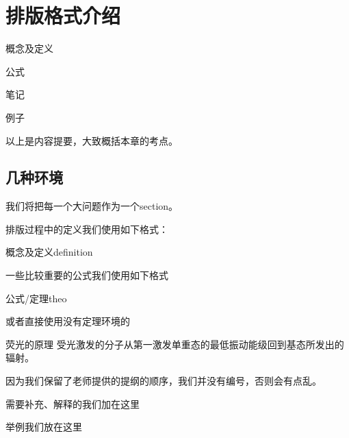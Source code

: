 \chapter*{排版格式介绍}
\begin{introduction}
	\item 概念及定义
	\item 公式
	\item 笔记
	\item 例子
\end{introduction}

以上是内容提要，大致概括本章的考点。

\section*{几种环境}
我们将把每一个大问题作为一个section。

排版过程中的定义我们使用如下格式：

\begin{definition*}{概念及定义}{definition}
	
\end{definition*}

一些比较重要的公式我们使用如下格式
\begin{theorem*}{公式/定理}{theo}
	
\end{theorem*}

或者直接使用没有定理环境的
\begin{emptytcb*}{荧光的原理}{}
	受光激发的分子从第一激发单重态的最低振动能级回到基态所发出的辐射。
\end{emptytcb*}

因为我们保留了老师提供的提纲的顺序，我们并没有编号，否则会有点乱。

\begin{note}
需要补充、解释的我们加在这里
\end{note}

\begin{example}
	举例我们放在这里
\end{example}